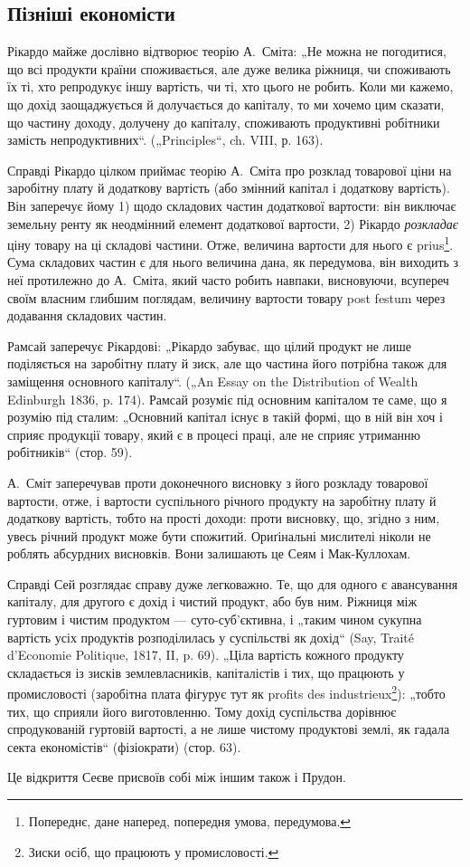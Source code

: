 \subsection[Пізніші економісти]{Пізніші економісти\footnotemark{}}


\label{original-299}
Рікардо
майже дослівно відтворює теорію А.~Сміта: „Не можна не
погодитися, що всі продукти країни споживається, але дуже велика ріжниця,
чи споживають їх ті, хто репродукує іншу вартість, чи ті, хто
цього не робить. Коли ми кажемо, що дохід заощаджується й долучається
до капіталу, то ми хочемо цим сказати, що частину доходу, долучену
до капіталу, споживають продуктивні робітники замість непродуктивних“.
(„Principles“, ch. VIII, р. 163).

Справді Рікардо цілком приймає теорію А.~Сміта про розклад товарової
ціни на заробітну плату й додаткову вартість (або змінний капітал
і додаткову вартість). Він заперечує йому 1) щодо складових частин
додаткової вартости: він виключає земельну ренту як неодмінний елемент
додаткової вартости, 2) Рікардо \emph{розкладає} ціну товару на ці складові
частини. Отже, величина вартости для нього є prius\footnote*{
Попереднє, дане наперед, попередня умова, передумова. 
}. Сума складових
частин є для нього величина дана, як передумова, він виходить з
неї протилежно до А.~Сміта, який часто робить навпаки, висновуючи,
всупереч своїм власним глибшим поглядам, величину вартости товару
post festum через додавання складових частин.

Рамсай заперечує Рікардові: „Рікардо забуває, що цілий продукт не
лише поділяється на заробітну плату й зиск, але що частина його потрібна
також для заміщення основного капіталу“. („An Essay on the Distribution
of Wealth Edinburgh 1836, p. 174). Рамсай розуміє під основним
капіталом те саме, що я розумію під сталим: „Основний капітал
існує в такій формі, що в ній він хоч і сприяє продукції товару, який є
в процесі праці, але не сприяє утриманню робітників“ (стор. 59).

А.~Сміт заперечував проти доконечного висновку з його розкладу
товарової вартости, отже, і вартости суспільного річного продукту на
заробітну плату й додаткову вартість, тобто на прості доходи: проти
висновку, що, згідно з ним, увесь річний продукт може бути спожитий.
Ориґінальні мислителі ніколи не роблять абсурдних висновків. Вони залишають
це Сеям і Мак-Куллохам.

Справді Сей розглядає справу дуже легковажно. Те, що для одного є
авансування капіталу, для другого є дохід і чистий продукт, або був ним.
Ріжниця між гуртовим і чистим продуктом — суто-суб’єктивна, і „таким чином
сукупна вартість усіх продуктів розподілилась у суспільстві як дохід“ (Say,
Traité d’Economie Politique, 1817, II, p. 69). „Ціла вартість кожного продукту
складається із зисків землевласників, капіталістів і тих, що працюють у
промисловості (заробітна плата фігурує тут як profits des industrieux\footnote*{
Зиски осіб, що працюють у промисловості. 
}):
„тобто тих, що сприяли його виготовленню. Тому дохід суспільства дорівнює
спродукованій   гуртовій   вартості, а не лише чистому
продуктові землі, як гадала секта економістів“ (фізіократи) (стор. 63).

Це відкриття Сеєве присвоїв собі між іншим також і Прудон.
